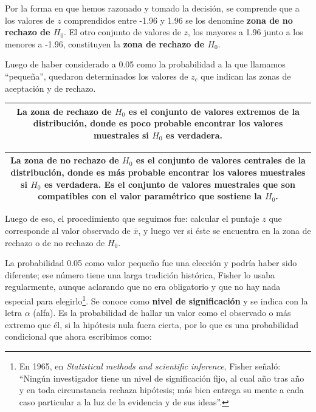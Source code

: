 \documentclass[]{book}
\let\rmarkdownfootnote\footnote%
\def\footnote{\protect\rmarkdownfootnote}
\begin{document}
Por la forma en que hemos razonado y tomado la decisión, se comprende
que a los valores de \(z\) comprendidos entre -1.96 y 1.96 se los denomine \textbf{zona de no rechazo de \(H_{0}\)}. El otro conjunto de valores de \(z\), los mayores a 1.96 junto a los menores a -1.96, constituyen la \textbf{zona de rechazo de \(H_{0}\)}.

Luego de haber considerado a 0.05 como la probabilidad a la que llamamos ``pequeña'', quedaron determinados los
valores de \(z_{c}\) que indican las zonas de aceptación y de rechazo.

\begin{longtable}[]{@{}c@{}}
\toprule
\endhead
\begin{minipage}[t]{0.97\columnwidth}\centering
La \textbf{zona de rechazo de \(H_{0}\)} es el conjunto de valores extremos de la distribución, donde es poco probable encontrar los valores muestrales si \(H_{0}\) es verdadera.\strut
\end{minipage}\tabularnewline
\bottomrule
\end{longtable}

\begin{longtable}[]{@{}c@{}}
\toprule
\endhead
\begin{minipage}[t]{0.97\columnwidth}\centering
La \textbf{zona de no rechazo de \(H_{0}\)} es el conjunto de valores centrales de la distribución, donde es más probable encontrar los valores muestrales si \(H_{0}\) es verdadera. Es el conjunto de valores muestrales que son compatibles con el valor paramétrico que sostiene la \(H_{0}\).\strut
\end{minipage}\tabularnewline
\bottomrule
\end{longtable}

Luego de eso, el procedimiento que seguimos fue: calcular el puntaje \(z\) que corresponde al valor observado de \(\overline{x}\), y luego ver si éste se encuentra en la zona de rechazo o de no rechazo de \(H_{0}\).

La probabilidad 0.05 como valor pequeño fue una elección y podría haber
sido diferente; ese número tiene una larga tradición histórica, Fisher
lo usaba regularmente, aunque aclarando que no era obligatorio y que no
hay nada especial para elegirlo\footnote{En 1965, en \emph{Statistical methods and scientific inference}, Fisher señaló: ``Ningún investigador tiene un nivel de significación fijo, al cual año tras año y en toda circunstancia rechaza hipótesis; más bien entrega su mente a cada caso particular a la luz de la evidencia y de sus ideas''.}. Se conoce como \textbf{nivel de significación} y se indica con la letra \(\alpha\) (alfa). Es la
probabilidad de hallar un valor como el observado o más extremo que él,
si la hipótesis nula fuera cierta, por lo que es una probabilidad
condicional que ahora escribimos como:
\end{document}
